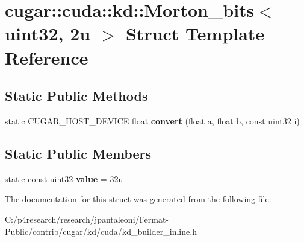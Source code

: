 \hypertarget{structcugar_1_1cuda_1_1kd_1_1_morton__bits_3_01uint32_00_012u_01_4}{}\section{cugar\+:\+:cuda\+:\+:kd\+:\+:Morton\+\_\+bits$<$ uint32, 2u $>$ Struct Template Reference}
\label{structcugar_1_1cuda_1_1kd_1_1_morton__bits_3_01uint32_00_012u_01_4}
\subsection*{Static Public Methods}
\begin{DoxyCompactItemize}
\item 
\mbox{\label{structcugar_1_1cuda_1_1kd_1_1_morton__bits_3_01uint32_00_012u_01_4_a1c9776e95f4a55b5b1f3c28efbc0c644}} 
static C\+U\+G\+A\+R\+\_\+\+H\+O\+S\+T\+\_\+\+D\+E\+V\+I\+CE float {\bfseries convert} (float a, float b, const uint32 i)
\end{DoxyCompactItemize}
\subsection*{Static Public Members}
\begin{DoxyCompactItemize}
\item 
\mbox{\label{structcugar_1_1cuda_1_1kd_1_1_morton__bits_3_01uint32_00_012u_01_4_ad0ff2adb2420056a7b5e7fd8c0da9be7}} 
static const uint32 {\bfseries value} = 32u
\end{DoxyCompactItemize}


The documentation for this struct was generated from the following file\+:\begin{DoxyCompactItemize}
\item 
C\+:/p4research/research/jpantaleoni/\+Fermat-\/\+Public/contrib/cugar/kd/cuda/kd\+\_\+builder\+\_\+inline.\+h\end{DoxyCompactItemize}
